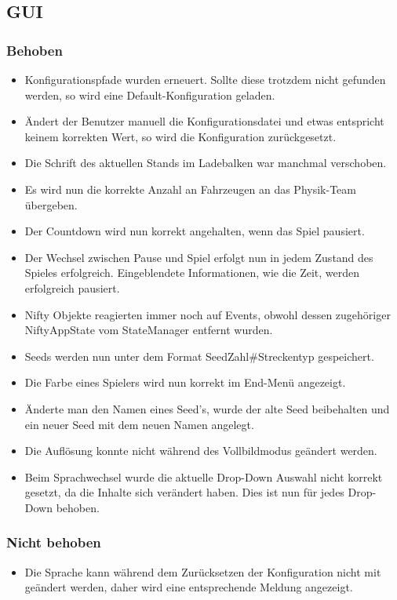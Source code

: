 \subsection{GUI}
\subsubsection{Behoben}
\begin{itemize}
    \item Konfigurationspfade wurden erneuert. Sollte diese trotzdem nicht gefunden
    werden, so wird eine Default-Konfiguration geladen.
    \item Ändert der Benutzer manuell die Konfigurationsdatei und etwas entspricht
    keinem korrekten Wert, so wird die Konfiguration zurückgesetzt.
    \item Die Schrift des aktuellen Stands im Ladebalken war manchmal verschoben.
    \item Es wird nun die korrekte Anzahl an Fahrzeugen an das Physik-Team 
    übergeben.
    \item Der Countdown wird nun korrekt angehalten, wenn das Spiel pausiert.
    \item Der Wechsel zwischen Pause und Spiel erfolgt nun in jedem Zustand des 
    Spieles erfolgreich. Eingeblendete Informationen, wie die Zeit, werden 
    erfolgreich pausiert.
    \item Nifty Objekte reagierten immer noch auf Events, obwohl dessen 
    zugehöriger NiftyAppState vom StateManager entfernt wurden.
    \item Seeds werden nun unter dem Format \glqq SeedZahl\#Streckentyp \grqq{} gespeichert.
    \item Die Farbe eines Spielers wird nun korrekt im End-Menü angezeigt.
    \item Änderte man den Namen eines Seed's, wurde der alte Seed beibehalten 
    und ein neuer Seed mit dem neuen Namen angelegt.
    \item Die Auflösung konnte nicht während des Vollbildmodus geändert werden.
    \item Beim Sprachwechsel wurde die aktuelle Drop-Down Auswahl nicht korrekt 
    gesetzt, da die Inhalte sich verändert haben. Dies ist nun für jedes 
    Drop-Down behoben. 
\end{itemize}

\subsubsection{Nicht behoben}
\begin{itemize}
    \item Die Sprache kann während dem Zurücksetzen der Konfiguration nicht mit 
    geändert werden, daher wird eine entsprechende Meldung angezeigt.
\end{itemize}